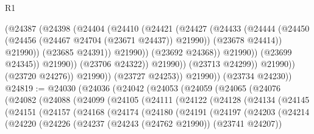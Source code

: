 \begin{lexlean}{R1}
\begin{coremodule}
                                      (@24387
                                        (@24398
                                          (@24404
                                            (@24410
                                              (@24421
                                                (@24427
                                                  (@24433
                                                    (@24444
                                                      (@24450
                                                        (@24456
                                                          (@24467 @24704 (@23671 @24437))
                                                          @21990))
                                                      (@23678 @24414))
                                                    @21990))
                                                (@23685 @24391))
                                              @21990))
                                          (@23692 @24368))
                                        @21990))
                                    (@23699 @24345))
                                  @21990))
                              (@23706 @24322))
                            @21990))
                        (@23713 @24299))
                      @21990))
                  (@23720 @24276))
                @21990))
            (@23727 @24253))
          @21990))
      (@23734 @24230))
@24819 := @24030
    (@24036
      (@24042
        (@24053
          (@24059
            (@24065
              (@24076
                (@24082
                  (@24088
                    (@24099
                      (@24105
                        (@24111
                          (@24122
                            (@24128
                              (@24134
                                (@24145
                                  (@24151
                                    (@24157
                                      (@24168
                                        (@24174
                                          (@24180
                                            (@24191
                                              (@24197
                                                (@24203
                                                  (@24214
                                                    (@24220
                                                      (@24226
                                                        (@24237
                                                          (@24243 (@24762 @21990))
                                                          (@23741 @24207))

\end{coremodule}
\end{lexlean}
